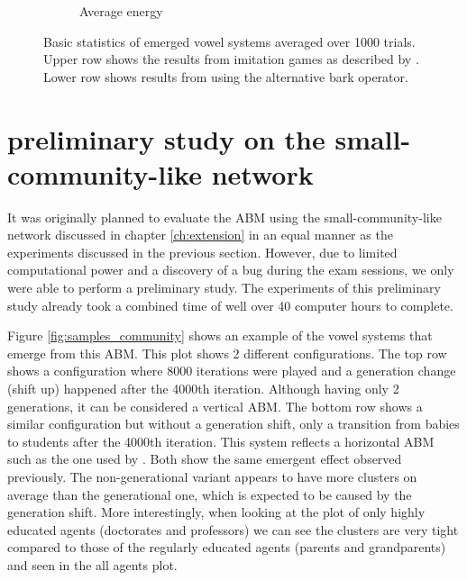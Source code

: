 \begin{figure}[ht]
\begin{subfigure}{.30\textwidth}
        \captionsetup{width=0.9\linewidth}
        \captionsetup{justification=centering}
        \caption{Average energy}
    \end{subfigure}
    \captionsetup{width=0.9\linewidth}
    \captionsetup{justification=centering}
    \caption{Basic statistics of emerged vowel systems averaged over 1000 trials.\\Upper row shows the results from imitation games as described by \citet{deBoer2000}.\\Lower row shows results from using the alternative bark operator.}
    \label{fig:general_bark_bdb}
\end{figure}


\clearpage
\section{preliminary study on the small-community-like network}
\label{sec:results_small_community}

It was originally planned to evaluate the ABM using the small-community-like network discussed in chapter \ref{ch:extension} in an equal manner as the experiments discussed in the previous section.
However, due to limited computational power and a discovery of a bug during the exam sessions, we only were able to perform a preliminary study.
The experiments of this preliminary study already took a combined time of well over 40 computer hours to complete.

Figure \ref{fig:samples_community} shows an example of the vowel systems that emerge from this ABM.
This plot shows 2 different configurations.
The top row shows a configuration where 8000 iterations were played and a generation change (shift up) happened after the 4000th iteration.
Although having only 2 generations, it can be considered a vertical ABM.
The bottom row shows a similar configuration but without a generation shift, only a transition from babies to students after the 4000th iteration.
This system reflects a horizontal ABM such as the one used by \citet{deBoer2000}.
Both show the same emergent effect observed previously.
The non-generational variant appears to have more clusters on average than the generational one, which is expected to be caused by the generation shift.
More interestingly, when looking at the plot of only highly educated agents (doctorates and professors) we can see the clusters are very tight compared to those of the regularly educated agents (parents and grandparents) and seen in the all agents plot.



